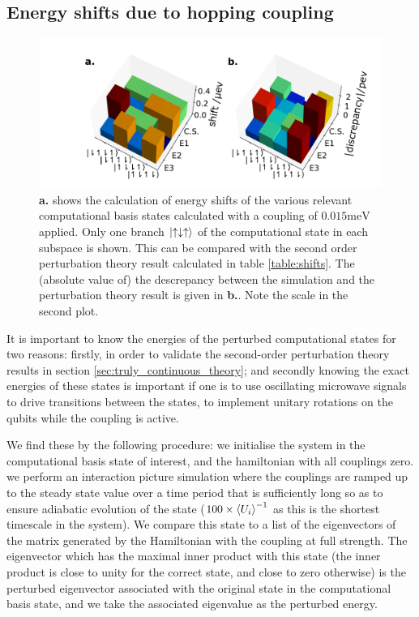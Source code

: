 \documentclass{report}
\begin{document}
\subsection{Energy shifts due to hopping coupling}

\begin{figure}[ht]
    \centering
    \includegraphics[scale = 0.4]{Figures/shifts.pdf}
    \caption{\textbf{a.} shows the calculation of energy shifts of the various relevant computational basis states calculated with a coupling of $0.015\unit{\milli\electronvolt}$ applied. Only one branch $\ket{\uparrow\downarrow\uparrow}$ of the computational state in each subspace is shown. This can be compared with the second order perturbation theory result calculated in table \ref{table:shifts}. The (absolute value of) the descrepancy between the simulation and the perturbation theory result is given in \textbf{b.}. Note the scale in the second plot.
    \label{fig:shifts}}
\end{figure}
It is important to know the energies of the perturbed computational states for two reasons: firstly, in order to validate the second-order perturbation theory results in section \ref{sec:truly_continuous_theory}; and secondly knowing the exact energies of these states is important if one is to use oscillating microwave signals to drive transitions between the states, to implement unitary rotations on the qubits while the coupling is active.

We find these by the following procedure: we initialise the system in the computational basis state of interest, and the hamiltonian with all couplings zero. we perform an interaction picture simulation where the couplings are ramped up to the steady state value over a time period that is sufficiently long so as to ensure adiabatic evolution of the state ($100\times\braket{U_i}^{-1}$ as this is the shortest timescale in the system). We compare this state to a list of the eigenvectors of the matrix generated by the Hamiltonian with the coupling at full strength. The eigenvector which has the maximal inner product with this state (the inner product is close to unity for the correct state, and close to zero otherwise) is the perturbed eigenvector associated with the original state in the computational basis state, and we take the associated eigenvalue as the perturbed energy.
\end{document}
